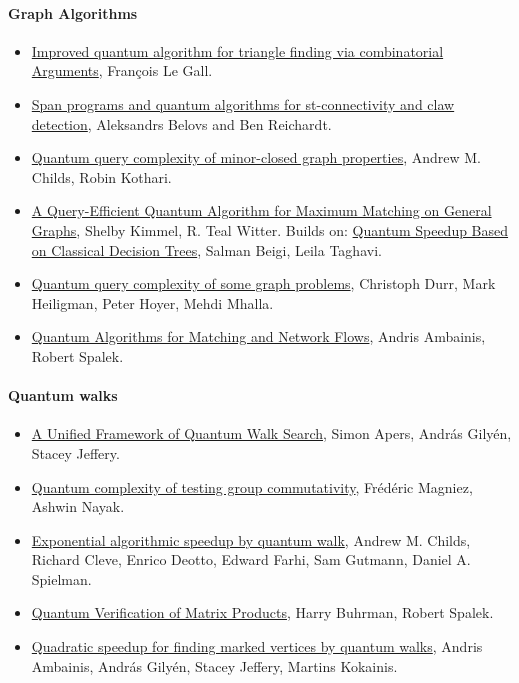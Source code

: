 \documentclass[12pt]{article}
\begin{document}
\paragraph*{Graph Algorithms}
\begin{itemize}
  \item \href{https://arxiv.org/abs/1407.0085}{Improved quantum algorithm for triangle finding via combinatorial Arguments}, Fran\c{c}ois Le Gall.
  \item \href{https://arxiv.org/abs/1203.2603}{Span programs and quantum algorithms for st-connectivity and claw detection}, Aleksandrs Belovs and Ben Reichardt.
  \item \href{https://arxiv.org/abs/1011.1443}{Quantum query complexity of minor-closed graph properties}, Andrew M. Childs, Robin Kothari.
  \item \href{https://arxiv.org/abs/2010.02324}{A Query-Efficient Quantum Algorithm for Maximum Matching on General Graphs}, Shelby Kimmel, R. Teal Witter.  Builds on: 
  \href{https://arxiv.org/abs/1905.13095}{Quantum Speedup Based on Classical Decision Trees}, Salman Beigi, Leila Taghavi.
  \item \href{https://arxiv.org/abs/quant-ph/0401091}{Quantum query complexity of some graph problems}, Christoph Durr, Mark Heiligman, Peter Hoyer, Mehdi Mhalla.
  \item \href{https://arxiv.org/abs/quant-ph/0508205}{Quantum Algorithms for Matching and Network Flows}, Andris Ambainis, Robert Spalek.
\end{itemize}

\paragraph*{Quantum walks}
\begin{itemize}
  \item \href{https://arxiv.org/abs/1912.04233}{A Unified Framework of Quantum Walk Search}, Simon Apers, Andr\'{a}s Gily\'{e}n, Stacey Jeffery.
  \item \href{https://arxiv.org/abs/quant-ph/0506265}{Quantum complexity of testing group commutativity}, Fr\'{e}d\'{e}ric Magniez, Ashwin Nayak.
  \item \href{https://arxiv.org/abs/quant-ph/0209131}{Exponential algorithmic speedup by quantum walk}, Andrew M. Childs, Richard Cleve, Enrico Deotto, Edward Farhi, Sam Gutmann, Daniel A. Spielman.
  \item \href{https://arxiv.org/abs/quant-ph/0409035}{Quantum Verification of Matrix Products}, Harry Buhrman, Robert Spalek.
  \item \href{https://arxiv.org/abs/1903.07493}{Quadratic speedup for finding marked vertices by quantum walks}, Andris Ambainis, András Gilyén, Stacey Jeffery, Martins Kokainis.
\end{itemize}
\end{document}
